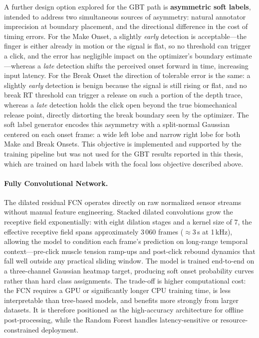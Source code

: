 A further design option explored for the GBT path is \textbf{asymmetric soft labels}, intended to address two simultaneous sources of asymmetry: natural annotator imprecision at boundary placement, and the directional difference in the cost of timing errors. For the Make Onset, a slightly \emph{early} detection is acceptable---the finger is either already in motion or the signal is flat, so no threshold can trigger a click, and the error has negligible impact on the optimizer's boundary estimate---whereas a \emph{late} detection shifts the perceived onset forward in time, increasing input latency. For the Break Onset the direction of tolerable error is the same: a slightly \emph{early} detection is benign because the signal is still rising or flat, and no break RT threshold can trigger a release on such a portion of the depth trace, whereas a \emph{late} detection holds the click open beyond the true biomechanical release point, directly distorting the break boundary seen by the optimizer. The soft label generator encodes this asymmetry with a split-normal Gaussian centered on each onset frame: a wide left lobe and narrow right lobe for both Make and Break Onsets. This objective is implemented and supported by the training pipeline but was not used for the GBT results reported in this thesis, which are trained on hard labels with the focal loss objective described above.

\paragraph{Fully Convolutional Network.}
The dilated residual FCN operates directly on raw normalized sensor streams without manual feature engineering. Stacked dilated convolutions grow the receptive field exponentially: with eight dilation stages and a kernel size of 7, the effective receptive field spans approximately 3\,060 frames ($\approx$3\,s at 1\,kHz), allowing the model to condition each frame's prediction on long-range temporal context---pre-click muscle tension ramp-ups and post-click rebound dynamics that fall well outside any practical sliding window. The model is trained end-to-end on a three-channel Gaussian heatmap target, producing soft onset probability curves rather than hard class assignments. The trade-off is higher computational cost: the FCN requires a GPU or significantly longer CPU training time, is less interpretable than tree-based models, and benefits more strongly from larger datasets. It is therefore positioned as the high-accuracy architecture for offline post-processing, while the Random Forest handles latency-sensitive or resource-constrained deployment.

